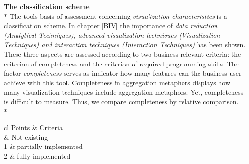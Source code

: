 \textbf{The classification scheme}\label{tool:classification}\\*
The tools basis of assessment concerning \textit{visualization characteristics} is a classification scheme. In chapter \ref{BIV} the importance of \textit{data reduction (Analytical Techniques), advanced visualization techniques (Visualization Techniques) and interaction techniques (Interaction Techniques)} has been shown. These three aspects are assessed according to two business relevant criteria: the criterion of completeness and the criterion of required programming skills. The factor \textit{completeness} serves as indicator how many features can the business user achieve with this tool. Completeness in aggregation metaphors displays how many visualization techniques include aggregation metaphors. Yet, completeness is difficult to measure. Thus, we compare completeness by relative comparison.\\*
\begin{table}[H]
	\caption[Tool Completeness]{Criteria Completeness: extend to which assessed aspect is implemented in tool}
	\label{programming-skills}
	\begin{tabu}{cl}
	\toprule
	Points & Criteria\\
	 & Not existing\\
	1 & partially implemented \\
	2 & fully implemented \\
	\bottomrule
	\end{tabu}
\end{table}


